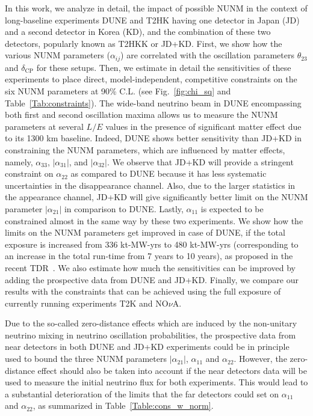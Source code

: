 \documentclass[11pt,a4paper]{article}
\begin{document}
In this work, we analyze in detail, the impact of possible NUNM in the context of long-baseline experiments DUNE and T2HK having one detector in Japan (JD) and a second detector in Korea (KD), and the combination of these two detectors, popularly known as T2HKK or JD+KD. First, we show how the  various NUNM parameters ($\alpha_{ij}$) are correlated with the oscillation parameters $\theta_{23}$ and $\delta_{\mathrm{CP}}$ for these setups.
Then, we estimate in detail the sensitivities of these experiments to place direct, model-independent, competitive constraints on the six NUNM parameters  at 90\% C.L. (see Fig.~\ref{fig:chi_sq} and Table~\ref{Tab:constraints}). 
 The wide-band neutrino beam in DUNE encompassing both first and second oscillation maxima allows us to measure the NUNM parameters at several $L/E$ values in the presence of significant matter effect due to its 1300 km baseline. Indeed, DUNE 
 shows better sensitivity than JD+KD in constraining the NUNM parameters, which are influenced by matter effects, namely, $\alpha_{33}$, $|\alpha_{31}|$, and $|\alpha_{32}|$.
We observe that JD+KD will provide a stringent constraint on $\alpha_{22}$ as compared to DUNE because it has less systematic uncertainties in the disappearance channel. 
Also, due to the larger statistics in the appearance channel, JD+KD will give significantly better limit on the NUNM parameter $|\alpha_{21}|$ in comparison to DUNE.
Lastly, $\alpha_{11}$ is expected to be constrained almost in the same way by these two experiments.
We show how the limits on the NUNM parameters get improved in case of DUNE, if the total exposure is increased from 336 kt-MW-yrs to 480 kt-MW-yrs (corresponding to an increase in the total run-time  from 7 years to 10 years), as proposed in the recent TDR~\cite{DUNE:2021cuw}.
 We also estimate how much the sensitivities can be improved by adding the prospective data from DUNE and JD+KD. Finally, we compare our results with the constraints that can be achieved using the full exposure of currently running experiments T2K and NO$\nu$A.
 
 Due to the so-called zero-distance effects which are induced by the non-unitary neutrino mixing in neutrino oscillation probabilities,
the prospective data from near detectors in both DUNE and JD+KD experiments could be in principle used to bound the three NUNM parameters $|\alpha_{21}|$, $\alpha_{11}$ and $\alpha_{22}$. However, the zero-distance effect should also be taken into account if the near detectors data will be used to measure the initial neutrino flux for both experiments. This would lead to a substantial deterioration of the  limits that the far detectors could set on $\alpha_{11}$ and $\alpha_{22}$, as summarized in Table~\ref{Table:cons_w_norm}.
\end{document}
